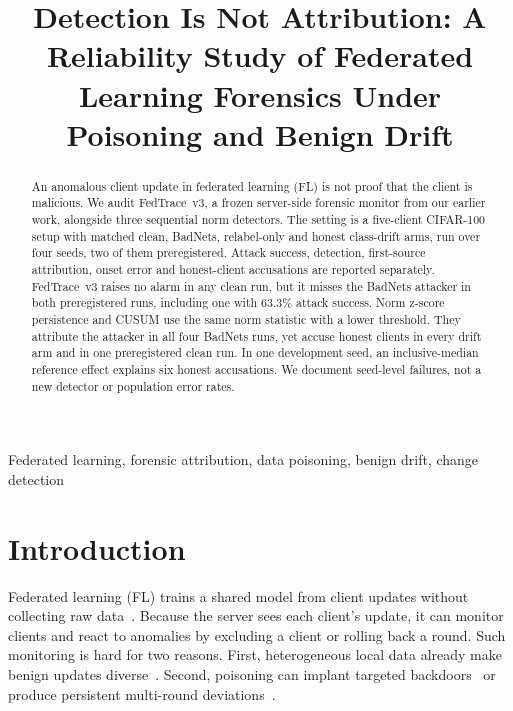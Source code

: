 \documentclass{article}
\title{Detection Is Not Attribution: A Reliability Study of Federated Learning Forensics Under Poisoning and Benign Drift}
\newcommand{\vthree}{FedTrace~v3}
\begin{document}
\ninept
\maketitle

\begin{abstract}
An anomalous client update in federated learning (FL) is not proof that the client is malicious. We audit
\vthree, a frozen server-side forensic monitor from our earlier work, alongside three sequential norm detectors.
The setting is a five-client CIFAR-100 setup with matched clean, BadNets, relabel-only and honest class-drift arms,
run over four seeds, two of them preregistered. Attack success, detection, first-source attribution, onset error
and honest-client accusations are reported separately. \vthree{} raises no alarm in any clean run, but it misses
the BadNets attacker in both preregistered runs, including one with 63.3\% attack success. Norm z-score persistence
and CUSUM use the same norm statistic with a lower threshold. They attribute the attacker in all four BadNets runs,
yet accuse honest clients in every drift arm and in one preregistered clean run. In one development seed, an
inclusive-median reference effect explains six honest accusations. We document seed-level failures, not a new
detector or population error rates.
\end{abstract}

\begin{keywords}
Federated learning, forensic attribution, data poisoning, benign drift, change detection
\end{keywords}

\section{Introduction}
\label{sec:intro}

Federated learning (FL) trains a shared model from client updates without collecting raw data~\cite{mcmahan2017fedavg}.
Because the server sees each client's update, it can monitor clients and react to anomalies by excluding a client
or rolling back a round. Such monitoring is hard for two reasons. First, heterogeneous local data already make
benign updates diverse~\cite{li2020fedprox,karimireddy2020scaffold}. Second, poisoning can implant targeted
backdoors~\cite{gu2019badnets,bagdasaryan2020backdoor} or produce persistent multi-round
deviations~\cite{xie2025multiround}.
\end{document}
